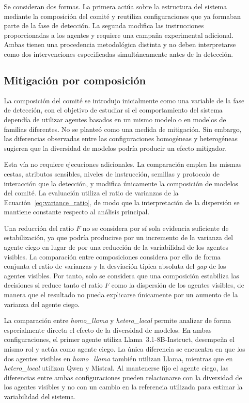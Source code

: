 Se consideran dos formas. La primera actúa sobre la estructura del sistema mediante la composición del comité y reutiliza configuraciones que ya formaban parte de la fase de detección. La segunda modifica las instrucciones proporcionadas a los agentes y requiere una campaña experimental adicional. Ambas tienen una procedencia metodológica distinta y no deben interpretarse como dos intervenciones especificadas simultáneamente antes de la detección.

\subsection{Mitigación por composición}
\label{subsec:mitigacion_composicion}

La composición del comité se introdujo inicialmente como una variable de la fase de detección, con el objetivo de estudiar si el comportamiento del sistema dependía de utilizar agentes basados en un mismo modelo o en modelos de familias diferentes. No se planteó como una medida de mitigación. Sin embargo, las diferencias observadas entre las configuraciones homogéneas y heterogéneas sugieren que la diversidad de modelos podría producir un efecto mitigador.

Esta vía no requiere ejecuciones adicionales. La comparación emplea las mismas cestas, atributos sensibles, niveles de instrucción, semillas y protocolo de interacción que la detección, y modifica únicamente la composición de modelos del comité. La evaluación utiliza el ratio de varianzas de la Ecuación~\ref{eq:variance_ratio}, de modo que la interpretación de la dispersión se mantiene constante respecto al análisis principal.

Una reducción del ratio $F$ no se considera por sí sola evidencia suficiente de estabilización, ya que podría producirse por un incremento de la varianza del agente ciego en lugar de por una reducción de la variabilidad de los agentes visibles. La comparación entre composiciones considera por ello de forma conjunta el ratio de varianzas y la desviación típica absoluta del \textit{gap} de los agentes visibles. Por tanto, solo se considera que una composición estabiliza las decisiones si reduce tanto el ratio $F$ como la dispersión de los agentes visibles, de manera que el resultado no pueda explicarse únicamente por un aumento de la varianza del agente ciego.

La comparación entre \textit{homo\_llama} y \textit{hetero\_local} permite analizar de forma especialmente directa el efecto de la diversidad de modelos. En ambas configuraciones, el primer agente utiliza Llama~3.1-8B-Instruct, desempeña el mismo rol y actúa como agente ciego. La única diferencia se encuentra en que los dos agentes visibles en \textit{homo\_llama} también utilizan Llama, mientras que en \textit{hetero\_local} utilizan Qwen y Mistral. Al mantenerse fijo el agente ciego, las diferencias entre ambas configuraciones pueden relacionarse con la diversidad de los agentes visibles y no con un cambio en la referencia utilizada para estimar la variabilidad del sistema.

